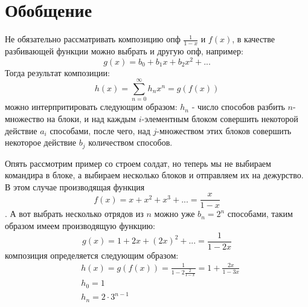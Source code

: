 \section{Обобщение}

Не обязательно рассматривать композицию опф $\frac{1}{1-x}$ и $f\left(x\right)$, в качестве разбивающей функции можно выбрать и другую опф, например:
\[
	g\left(x\right) = b_0 + b_1 x + b_2 x^2 + ...
\]
Тогда результат композиции:
\[
	h\left(x\right) = \sum_{n=0}^\infty h_n x^n = g\left(f\left(x\right)\right)
\]
можно интерпритировать следующим образом: $h_n$ - число способов разбить $n$- множество на блоки, и над каждым $i$-элементным блоком совершить некоторой действие $a_i$ способами, после чего, над $j$-множеством этих блоков совершить некоторое действие $b_j$ количеством способов.

Опять рассмотрим пример со строем солдат, но теперь мы не выбираем командира в блоке, а выбираем несколько блоков и отправляем их на дежурство. В этом случае производящая функция $$ f\left(x\right) = x + x^2 + x^3 + ... = \frac{x}{1-x} $$. А вот выбрать несколько отрядов из $n$ можно уже $b_n = 2^n$ способами, таким образом имеем производящую функцию:
\[
	g\left(x\right) = 1 + 2x + \left(2x\right)^2 + ... = \frac{1}{1-2x}
\]
композиция определяется следующим образом:
\[
	\begin{split}
		& h\left(x\right) = g\left(f\left(x\right)\right) = \frac{1}{1 - 2\frac{2}{1-x}} = 1 + \frac{2x}{1-3x}\\
		& h_0 = 1\\
		& h_n = 2\cdot3^{n-1}
	\end{split}
\]
